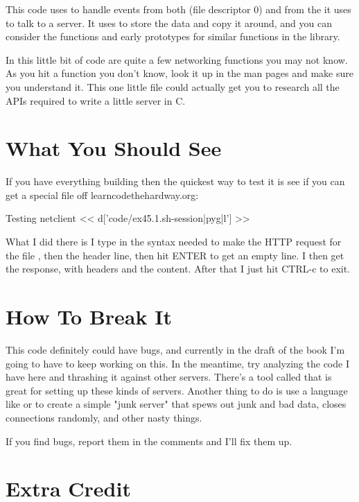 This code uses  to handle events from both
 (file descriptor 0) and from the 
it uses to talk to a server.  It uses  to
store the data and copy it around, and you can consider the
functions  and  early
prototypes for similar functions in the 
library.

In this little bit of code are quite a few networking functions
you may not know.  As you hit a function you don't know, look it up
in the man pages and make sure you understand it.  This one little
file could actually get you to research all the APIs required to
write a little server in C.

\section{What You Should See}

If you have everything building then the quickest way to test it is 
see if you can get a special file off learncodethehardway.org:

\begin{code}{Testing netclient}
<< d['code/ex45.1.sh-session|pyg|l'] >>
\end{code}

What I did there is I type in the syntax needed to make the HTTP request
for the file , then the  header line, then
hit ENTER to get an empty line.  I then get the response, with headers
and the content.  After that I just hit CTRL-c to exit.

\section{How To Break It}

This code definitely could have bugs, and currently in the draft of the
book I'm going to have to keep working on this.  In the meantime, try
analyzing the code I have here and thrashing it against other servers.
There's a tool called  that is great for setting up
these kinds of servers.  Another thing to do is use a language like
 or  to create a simple "junk server" that
spews out junk and bad data, closes connections randomly, and other
nasty things.

If you find bugs, report them in the comments and I'll fix them up.

\section{Extra Credit}


